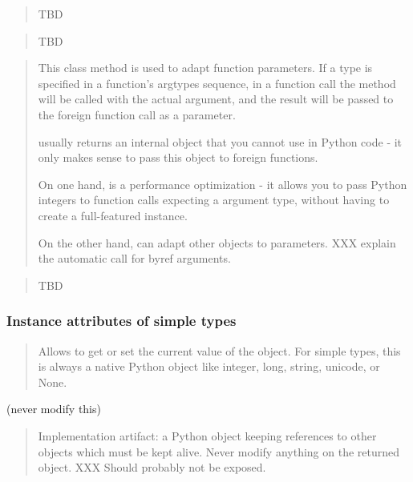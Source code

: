 \begin{quote}

TBD
\end{quote}

\begin{quote}

TBD
\end{quote}

\begin{quote}

This class method is used to adapt function parameters.  If a type
is specified in a function's argtypes sequence, in a function call
the  method will be called with the actual
argument, and the result will be passed to the foreign function
call as a parameter.

 usually returns an internal object that you cannot
use in Python code - it only makes sense to pass this object to
foreign functions.

On one hand,  is a performance optimization - it
allows you to pass Python integers to function calls expecting a
 argument type, without having to create a full-featured
 instance.

On the other hand,  can adapt other objects to
parameters.  XXX explain the automatic  call for byref
arguments.
\end{quote}

\begin{quote}

TBD
\end{quote}


\subsubsection{Instance attributes of simple types\label{ctypes-instance-attributes-of-simple-types}}

\begin{quote}

Allows to get or set the current value of the object.  For simple
types, this is always a native Python object like integer, long,
string, unicode, or None.
\end{quote}

 (never modify this)
\begin{quote}

Implementation artifact: a Python object keeping references to
other objects which must be kept alive.  Never modify anything on
the returned object. XXX Should probably not be exposed.
\end{quote}

